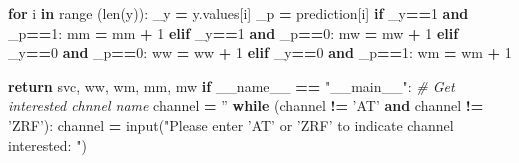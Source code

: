 \documentclass[10pt,letterpaper]{article}
\newenvironment{Shaded}{\begin{snugshade}}{\end{snugshade}}
\newcommand{\KeywordTok}[1]{\textcolor[rgb]{0.13,0.29,0.53}{\textbf{#1}}}
\newcommand{\DecValTok}[1]{\textcolor[rgb]{0.00,0.00,0.81}{#1}}
\newcommand{\StringTok}[1]{\textcolor[rgb]{0.31,0.60,0.02}{#1}}
\newcommand{\CommentTok}[1]{\textcolor[rgb]{0.56,0.35,0.01}{\textit{#1}}}
\newcommand{\VariableTok}[1]{\textcolor[rgb]{0.00,0.00,0.00}{#1}}
\newcommand{\ControlFlowTok}[1]{\textcolor[rgb]{0.13,0.29,0.53}{\textbf{#1}}}
\newcommand{\OperatorTok}[1]{\textcolor[rgb]{0.81,0.36,0.00}{\textbf{#1}}}
\newcommand{\BuiltInTok}[1]{#1}
\newcommand{\NormalTok}[1]{#1}
\begin{document}
\begin{Shaded}
\begin{Highlighting}[]
    \ControlFlowTok{for}\NormalTok{ i }\KeywordTok{in} \BuiltInTok{range}\NormalTok{ (}\BuiltInTok{len}\NormalTok{(y)):}
\NormalTok{        _y }\OperatorTok{=}\NormalTok{ y.values[i]}
\NormalTok{        _p }\OperatorTok{=}\NormalTok{ prediction[i]}
        \ControlFlowTok{if}\NormalTok{ _y}\OperatorTok{==}\DecValTok{1} \KeywordTok{and}\NormalTok{ _p}\OperatorTok{==}\DecValTok{1}\NormalTok{:}
\NormalTok{            mm }\OperatorTok{=}\NormalTok{ mm }\OperatorTok{+} \DecValTok{1}
        \ControlFlowTok{elif}\NormalTok{ _y}\OperatorTok{==}\DecValTok{1} \KeywordTok{and}\NormalTok{ _p}\OperatorTok{==}\DecValTok{0}\NormalTok{:}
\NormalTok{            mw }\OperatorTok{=}\NormalTok{ mw }\OperatorTok{+} \DecValTok{1}
        \ControlFlowTok{elif}\NormalTok{ _y}\OperatorTok{==}\DecValTok{0} \KeywordTok{and}\NormalTok{ _p}\OperatorTok{==}\DecValTok{0}\NormalTok{:}
\NormalTok{            ww }\OperatorTok{=}\NormalTok{ ww }\OperatorTok{+} \DecValTok{1}
        \ControlFlowTok{elif}\NormalTok{ _y}\OperatorTok{==}\DecValTok{0} \KeywordTok{and}\NormalTok{ _p}\OperatorTok{==}\DecValTok{1}\NormalTok{:}
\NormalTok{            wm }\OperatorTok{=}\NormalTok{ wm }\OperatorTok{+} \DecValTok{1}
    
    \ControlFlowTok{return}\NormalTok{ svc, ww, wm, mm, mw}
\ControlFlowTok{if} \VariableTok{__name__} \OperatorTok{==} \StringTok{"__main__"}\NormalTok{:}
    \CommentTok{# Get interested chnnel name}
\NormalTok{    channel }\OperatorTok{=} \StringTok{''}
    \ControlFlowTok{while}\NormalTok{ (channel }\OperatorTok{!=} \StringTok{'AT'} \KeywordTok{and}\NormalTok{ channel }\OperatorTok{!=} \StringTok{'ZRF'}\NormalTok{):}
\NormalTok{        channel }\OperatorTok{=} \BuiltInTok{input}\NormalTok{(}\StringTok{"Please enter 'AT' or 'ZRF' to indicate channel interested: "}\NormalTok{)}
    

\end{Highlighting}
\end{Shaded}
\end{document}
